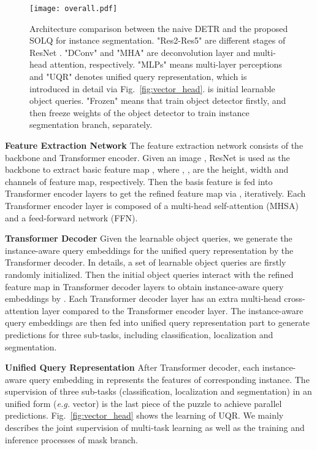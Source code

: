 \documentclass{article}
\begin{document}
\begin{figure}[h]
\centering
\texttt{[image: overall.pdf]}
\caption{Architecture comparison between the naive DETR and the proposed SOLQ for instance segmentation. "Res2-Res5" are different stages of ResNet \cite{he2016resnet}. "DConv" and "MHA" are deconvolution \cite{zeiler2010deconvolutional} layer and multi-head attention, respectively. "MLPs" means multi-layer perceptions and "UQR" denotes unified query representation, which is introduced in detail via Fig.~\ref{fig:vector_head}.  is initial learnable object queries. "Frozen" means that train object detector firstly, and then freeze weights of the object detector to train instance segmentation branch, separately.}
\label{fig:architecture}
\end{figure}

\textbf{Feature Extraction Network}
The feature extraction network consists of the backbone and Transformer encoder. Given an image , ResNet \cite{he2016resnet} is used as the backbone to extract basic feature map , where , ,  are the height, width and channels of feature map, respectively. Then the basis feature  is fed into  Transformer encoder layers to get the refined feature map  via , iteratively. Each Transformer encoder layer  is composed of a multi-head self-attention (MHSA) and a feed-forward network (FFN).

\textbf{Transformer Decoder}
Given the learnable object queries, we generate the instance-aware query embeddings for the unified query representation by the Transformer decoder. In details, a set of learnable object queries  are firstly randomly initialized. Then the initial object queries  interact with the refined feature map  in  Transformer decoder layers to obtain instance-aware query embeddings  by . Each Transformer decoder layer  has an extra multi-head cross-attention layer compared to the Transformer encoder layer. The instance-aware query embeddings  are then fed into unified query representation part to generate predictions for three sub-tasks, including classification, localization and segmentation.

\textbf{Unified Query Representation}
After Transformer decoder, each instance-aware query embedding in  represents the features of corresponding instance. The supervision of three sub-tasks (classification, localization and segmentation) in an unified form (\textit{e.g.} vector) is the last piece of the puzzle to achieve parallel predictions. Fig.~\ref{fig:vector_head} shows the learning of UQR. We mainly describes the joint supervision of multi-task learning as well as the training and inference processes of mask branch.
\end{document}
